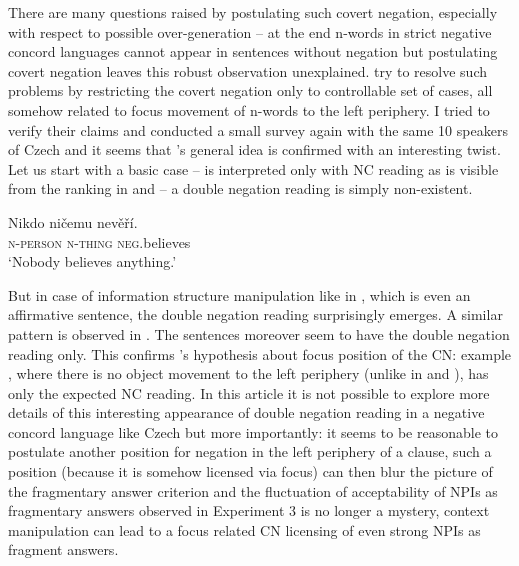 \documentclass[output=paper,
]{langscibook}
\begin{document}
\noindent There are many questions raised by postulating such covert negation, especially with respect to possible over-generation -- at the end n-words in strict negative concord languages cannot appear in sentences without negation but postulating covert negation leaves this robust observation unexplained. \cite{fualuaus2016fragment} try to resolve such problems by restricting the covert negation only to controllable set of cases, all somehow related to focus movement of n-words to the left periphery. I tried to verify their claims and conducted a small survey again with the same 10 speakers of Czech and it seems that \citeauthor{fualuaus2016fragment}'s general idea is confirmed with an interesting twist. Let us start with a basic case --  is interpreted only with NC reading as is visible from the ranking in  and  -- a double negation reading is simply non-existent.

\ea\label{ex-38} \gll Nikdo ničemu nevěří.\\
\textsc{n-person} \textsc{n-thing} \textsc{neg}.believes\\
\glt `Nobody believes anything.'
\z
\z

\noindent But in case of information structure manipulation like in , which is even an affirmative sentence, the double negation reading surprisingly emerges. A similar pattern is observed in . The sentences moreover seem to have the double negation reading only. This confirms \citeauthor{fualuaus2016fragment}'s hypothesis about focus position of the CN: example , where there is no object movement to the left periphery (unlike in  and ), has only the expected NC reading. In this article it is not possible to explore more details of this interesting appearance of double negation reading in a negative concord language like Czech but more importantly: it seems to be reasonable to postulate another position for negation in the left periphery of a clause, such a position (because it is somehow licensed via focus) can then blur the picture of the fragmentary answer criterion and the fluctuation of acceptability of NPIs as fragmentary answers observed in Experiment 3 is no longer a mystery, context manipulation can lead to a focus related CN licensing of even strong NPIs as fragment answers.
\end{document}
